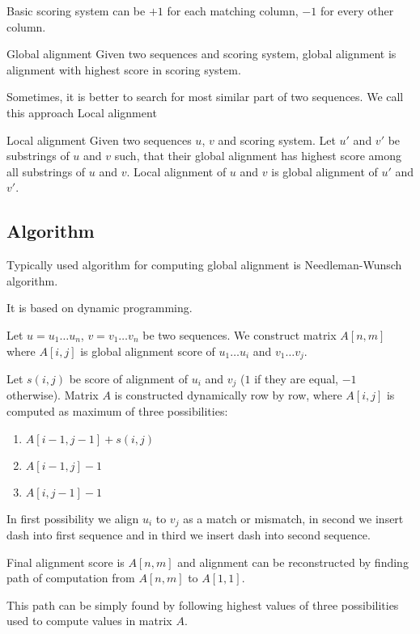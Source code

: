 Basic scoring system can be $+1$ for each matching column, $-1$ for every other column.

\begin{definition}{Global alignment}
Given two sequences and scoring system, global alignment is alignment with highest score in scoring system.
\end{definition}

Sometimes, it is better to search for most similar part of two sequences. We call this approach Local alignment

\begin{definition}{Local alignment}
Given two sequences $u$, $v$ and scoring system. Let $u'$ and $v'$ be substrings of $u$ and $v$ such, that their global alignment has highest score among all substrings of $u$ and $v$. Local alignment of $u$ and $v$ is global alignment of $u'$ and $v'$.
\end{definition}

\subsection{Algorithm}
Typically used algorithm for computing global alignment is Needleman-Wunsch algorithm.

It is based on dynamic programming. 

Let $u=u_1 \dots u_n$, $v=v_1 \dots v_n$ be two sequences. We construct matrix $A[n,m]$ where $A[i,j]$ is global alignment score of $u_1 \dots u_i$ and $v_1 \dots v_j$.

Let $s(i,j)$ be score of alignment of $u_i$ and $v_j$ ($1$ if they are equal, $-1$ otherwise).
Matrix $A$ is constructed dynamically row by row, where $A[i,j]$ is computed as maximum of three possibilities:
\begin{enumerate}
\item $A[i-1,j-1]+s(i,j)$
\item $A[i-1,j]-1$
\item $A[i,j-1]-1$
\end{enumerate}

In first possibility we align $u_i$ to $v_j$ as a match or mismatch, in second we insert dash into first sequence and in third we insert dash into second sequence.

Final alignment score is $A[n,m]$ and alignment can be reconstructed by finding path of computation from $A[n,m]$ to $A[1,1]$.

This path can be simply found by following highest values of three possibilities used to compute values in matrix $A$. 


